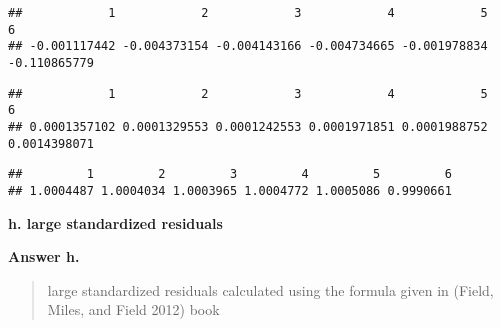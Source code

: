 \documentclass[
]{article}
\newenvironment{Shaded}{\begin{snugshade}}{\end{snugshade}}
\newcommand{\DecValTok}[1]{\textcolor[rgb]{0.00,0.00,0.81}{#1}}
\newcommand{\KeywordTok}[1]{\textcolor[rgb]{0.13,0.29,0.53}{\textbf{#1}}}
\newcommand{\NormalTok}[1]{#1}
\newcommand{\OperatorTok}[1]{\textcolor[rgb]{0.81,0.36,0.00}{\textbf{#1}}}
\newcommand{\StringTok}[1]{\textcolor[rgb]{0.31,0.60,0.02}{#1}}
\begin{document}
\begin{verbatim}
##            1            2            3            4            5            6 
## -0.001117442 -0.004373154 -0.004143166 -0.004734665 -0.001978834 -0.110865779
\end{verbatim}

\begin{Shaded}
\end{Shaded}

\begin{verbatim}
##            1            2            3            4            5            6 
## 0.0001357102 0.0001329553 0.0001242553 0.0001971851 0.0001988752 0.0014398071
\end{verbatim}

\begin{Shaded}
\end{Shaded}

\begin{verbatim}
##         1         2         3         4         5         6 
## 1.0004487 1.0004034 1.0003965 1.0004772 1.0005086 0.9990661
\end{verbatim}

\textbf{h. large standardized residuals }

\textbf{Answer h.}

\begin{quote}
large standardized residuals calculated using the formula given in
(Field, Miles, and Field 2012) book
\end{quote}

\begin{Shaded}
\end{Shaded}
\end{document}
